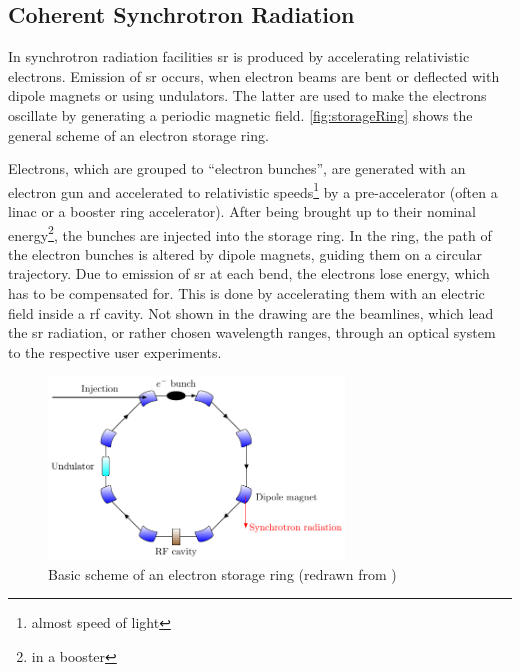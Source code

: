 \subsection{Coherent Synchrotron Radiation}
In synchrotron radiation facilities \gls{sr} is produced by accelerating relativistic electrons.
Emission of \gls{sr} occurs, when electron beams are bent or deflected with dipole magnets or using undulators. The latter are used to make the electrons oscillate by generating a periodic magnetic field.  
\autoref{fig:storageRing} shows the general scheme of an electron storage ring.

Electrons, which are grouped to ``electron bunches'', are generated with an electron gun and accelerated to relativistic speeds\footnote{almost speed of light} by a pre-accelerator (often a \gls{linac} or a booster ring accelerator). %
After being brought up to their nominal energy\footnote{in a booster}, the bunches are injected into the storage ring.
In the ring, the path of the electron bunches is altered by dipole magnets, guiding them on a circular trajectory. %
Due to emission of \gls{sr} at each bend, the electrons lose energy, which has to be compensated for.
This is done by accelerating them with an electric field inside a \gls{rf} cavity.
Not shown in the drawing are the beamlines, which lead the \gls{sr} radiation, or rather chosen wavelength ranges, through an optical system to the respective user experiments. \cite{roussel2014,rota2018}

\begin{figure}[tbh]
	\centering
	\includegraphics[width=0.7\textwidth]{chap/02-theory/img/synchrotron.pdf}
	\caption{Basic scheme of an electron storage ring (redrawn from \cite{roussel2014})}
	\label{fig:storageRing}
\end{figure}

